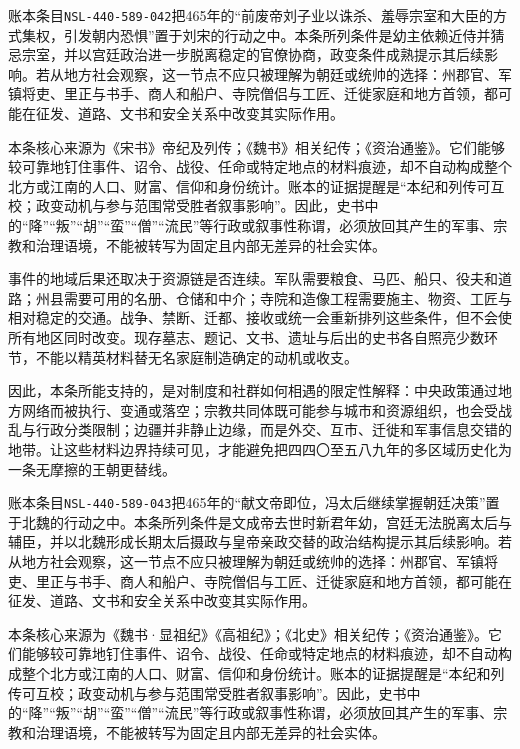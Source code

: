 账本条目\texttt{NSL-440-589-042}把465年的“前废帝刘子业以诛杀、羞辱宗室和大臣的方式集权，引发朝内恐惧”置于刘宋的行动之中。本条所列条件是幼主依赖近侍并猜忌宗室，并以宫廷政治进一步脱离稳定的官僚协商，政变条件成熟提示其后续影响。若从地方社会观察，这一节点不应只被理解为朝廷或统帅的选择：州郡官、军镇将吏、里正与书手、商人和船户、寺院僧侣与工匠、迁徙家庭和地方首领，都可能在征发、道路、文书和安全关系中改变其实际作用。

本条核心来源为《宋书》帝纪及列传；《魏书》相关纪传；《资治通鉴》。它们能够较可靠地钉住事件、诏令、战役、任命或特定地点的材料痕迹，却不自动构成整个北方或江南的人口、财富、信仰和身份统计。账本的证据提醒是“本纪和列传可互校；政变动机与参与范围常受胜者叙事影响”。因此，史书中的“降”“叛”“胡”“蛮”“僧”“流民”等行政或叙事性称谓，必须放回其产生的军事、宗教和治理语境，不能被转写为固定且内部无差异的社会实体。

事件的地域后果还取决于资源链是否连续。军队需要粮食、马匹、船只、役夫和道路；州县需要可用的名册、仓储和中介；寺院和造像工程需要施主、物资、工匠与相对稳定的交通。战争、禁断、迁都、接收或统一会重新排列这些条件，但不会使所有地区同时改变。现存墓志、题记、文书、遗址与后出的史书各自照亮少数环节，不能以精英材料替无名家庭制造确定的动机或收支。

因此，本条所能支持的，是对制度和社群如何相遇的限定性解释：中央政策通过地方网络而被执行、变通或落空；宗教共同体既可能参与城市和资源组织，也会受战乱与行政分类限制；边疆并非静止边缘，而是外交、互市、迁徙和军事信息交错的地带。让这些材料边界持续可见，才能避免把四四〇至五八九年的多区域历史化为一条无摩擦的王朝更替线。

账本条目\texttt{NSL-440-589-043}把465年的“献文帝即位，冯太后继续掌握朝廷决策”置于北魏的行动之中。本条所列条件是文成帝去世时新君年幼，宫廷无法脱离太后与辅臣，并以北魏形成长期太后摄政与皇帝亲政交替的政治结构提示其后续影响。若从地方社会观察，这一节点不应只被理解为朝廷或统帅的选择：州郡官、军镇将吏、里正与书手、商人和船户、寺院僧侣与工匠、迁徙家庭和地方首领，都可能在征发、道路、文书和安全关系中改变其实际作用。

本条核心来源为《魏书·显祖纪》《高祖纪》；《北史》相关纪传；《资治通鉴》。它们能够较可靠地钉住事件、诏令、战役、任命或特定地点的材料痕迹，却不自动构成整个北方或江南的人口、财富、信仰和身份统计。账本的证据提醒是“本纪和列传可互校；政变动机与参与范围常受胜者叙事影响”。因此，史书中的“降”“叛”“胡”“蛮”“僧”“流民”等行政或叙事性称谓，必须放回其产生的军事、宗教和治理语境，不能被转写为固定且内部无差异的社会实体。


